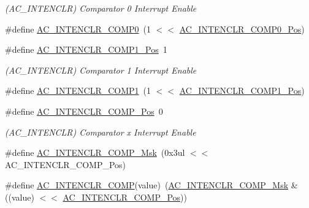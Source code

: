 \begin{DoxyCompactItemize}
\begin{DoxyCompactList}\small\item\em (A\+C\+\_\+\+I\+N\+T\+E\+N\+C\+LR) Comparator 0 Interrupt Enable \end{DoxyCompactList}\item 
\#define \mbox{\hyperlink{group___s_a_m_d21___a_c_gad35d3243f99f27892051f17428b96fb5}{A\+C\+\_\+\+I\+N\+T\+E\+N\+C\+L\+R\+\_\+\+C\+O\+M\+P0}}~(1 $<$$<$ \mbox{\hyperlink{group___s_a_m_d21___a_c_ga4168c6a55362a465c232cdfae855edb6}{A\+C\+\_\+\+I\+N\+T\+E\+N\+C\+L\+R\+\_\+\+C\+O\+M\+P0\+\_\+\+Pos}})
\item 
\#define \mbox{\hyperlink{group___s_a_m_d21___a_c_gae1f585c9c3dfbbcbb14748de3d028334}{A\+C\+\_\+\+I\+N\+T\+E\+N\+C\+L\+R\+\_\+\+C\+O\+M\+P1\+\_\+\+Pos}}~1
\begin{DoxyCompactList}\small\item\em (A\+C\+\_\+\+I\+N\+T\+E\+N\+C\+LR) Comparator 1 Interrupt Enable \end{DoxyCompactList}\item 
\#define \mbox{\hyperlink{group___s_a_m_d21___a_c_ga3c78ac5c7106e38172929577f836bc3e}{A\+C\+\_\+\+I\+N\+T\+E\+N\+C\+L\+R\+\_\+\+C\+O\+M\+P1}}~(1 $<$$<$ \mbox{\hyperlink{group___s_a_m_d21___a_c_gae1f585c9c3dfbbcbb14748de3d028334}{A\+C\+\_\+\+I\+N\+T\+E\+N\+C\+L\+R\+\_\+\+C\+O\+M\+P1\+\_\+\+Pos}})
\item 
\#define \mbox{\hyperlink{group___s_a_m_d21___a_c_ga444b400feaaa1e25e0626635cfdf1144}{A\+C\+\_\+\+I\+N\+T\+E\+N\+C\+L\+R\+\_\+\+C\+O\+M\+P\+\_\+\+Pos}}~0
\begin{DoxyCompactList}\small\item\em (A\+C\+\_\+\+I\+N\+T\+E\+N\+C\+LR) Comparator x Interrupt Enable \end{DoxyCompactList}\item 
\#define \mbox{\hyperlink{group___s_a_m_d21___a_c_gac09eb38f343d78f35b102abc6f4ccc4a}{A\+C\+\_\+\+I\+N\+T\+E\+N\+C\+L\+R\+\_\+\+C\+O\+M\+P\+\_\+\+Msk}}~(0x3ul $<$$<$ A\+C\+\_\+\+I\+N\+T\+E\+N\+C\+L\+R\+\_\+\+C\+O\+M\+P\+\_\+\+Pos)
\item 
\#define \mbox{\hyperlink{group___s_a_m_d21___a_c_ga1ef2215e29f00bfc12375e93c4d6e9fb}{A\+C\+\_\+\+I\+N\+T\+E\+N\+C\+L\+R\+\_\+\+C\+O\+MP}}(value)~(\mbox{\hyperlink{group___s_a_m_d21___a_c_gac09eb38f343d78f35b102abc6f4ccc4a}{A\+C\+\_\+\+I\+N\+T\+E\+N\+C\+L\+R\+\_\+\+C\+O\+M\+P\+\_\+\+Msk}} \& ((value) $<$$<$ \mbox{\hyperlink{group___s_a_m_d21___a_c_ga444b400feaaa1e25e0626635cfdf1144}{A\+C\+\_\+\+I\+N\+T\+E\+N\+C\+L\+R\+\_\+\+C\+O\+M\+P\+\_\+\+Pos}}))

\end{DoxyCompactItemize}
